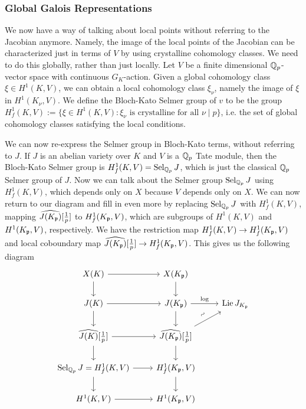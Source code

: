 \subsubsection{Global Galois Representations}

We now have a way of talking about local points without referring to the Jacobian anymore. Namely, the image of the local points of the Jacobian can be characterized just in terms of $V$ by using crystalline cohomology classes. We need to do this globally, rather than just locally. Let $V$ be a finite dimensional $\mathbb{Q}_p$-vector space with continuous $G_K$-action. Given a global cohomology class $\xi \in H^1(K,V)$, we can obtain a local cohomology class $\xi_\nu$, namely the image of $\xi$ in $H^1(K_\nu,V)$. We define the Bloch-Kato Selmer group of $v$ to be the group $H_f^1(K,V):= \{ \xi \in H^1(K,V) \colon \xi_\nu \text{ is crystalline for all } \nu \mid p \}$, i.e. the set of global cohomology classes satisfying the local conditions. 


We can now re-express the Selmer group in Bloch-Kato terms, without referring to $J$. If $J$ is an abelian variety over $K$ and $V$ is a $\mathbb{Q}_p$ Tate module, then the Bloch-Kato Selmer group is $H_f^1(K,V)= \operatorname{Sel}_{\mathbb{Q}_p} J$, which is just the classical $\mathbb{Q}_p$ Selmer group of $J$. Now we can talk about the Selmer group $\operatorname{Sel}_{\mathbb{Q}_p} J$ using $H_f^1(K,V)$, which depends only on $X$ because $V$ depends only on $X$. We can now return to our diagram and fill in even more by replacing $\operatorname{Sel}_{\mathbb{Q}_p} J$ with $H_f^1(K,V)$, mapping $\widehat{J(K_{\mathfrak{p}})}[\frac{1}{p}]$ to $H_f^1(K_{\mathfrak{p}},V)$, which are subgroups of $H^1(K,V)$ and $H^1(K_{\mathfrak{p}},V)$, respectively. We have the restriction map $H_f^1(K,V) \to H_f^1(K_{\mathfrak{p}},V)$ and local coboundary map $\widehat{J(K_{\mathfrak{p}})}[\frac{1}{p}] \to H_f^1(K_{\mathfrak{p}},V)$. This gives us the following diagram
	\[
	\begin{tikzcd}
	X(K) \arrow{d} \arrow{r} & X(K_\p) \arrow{d} \\
	J(K) \arrow{r} \arrow{d} & J(K_\p) \arrow{r}{\log} \arrow{d} & \lie J_{K_\p} \\
	\widehat{J(K)}[\frac{1}{p}] \arrow{r} \arrow{d} & \widehat{J(K_\p)}[\frac{1}{p}] \arrow{ur}{\rotatebox{45}{$\sim$}} \arrow{d} \\
	\sel_{\Qp} J \arrow{d}= H_f^1(K,V) \arrow{r} &  H_f^1(K_\p,V) \arrow{d} \\
	H^1(K,V) \arrow{r} & H^1(K_\p,V)
	\end{tikzcd}
	\]














